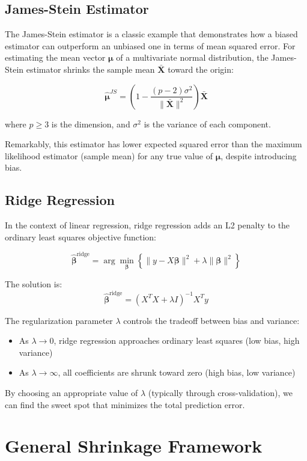 \documentclass{article}
\begin{document}
\subsection{James-Stein Estimator}

The James-Stein estimator is a classic example that demonstrates how a biased estimator can outperform an unbiased one in terms of mean squared error. For estimating the mean vector $\boldsymbol{\mu}$ of a multivariate normal distribution, the James-Stein estimator shrinks the sample mean $\bar{\mathbf{X}}$ toward the origin:

\[
\hat{\boldsymbol{\mu}}^{JS} = \left(1 - \frac{(p-2)\sigma^2}{\|\bar{\mathbf{X}}\|^2}\right) \bar{\mathbf{X}}
\]

where $p \geq 3$ is the dimension, and $\sigma^2$ is the variance of each component.

Remarkably, this estimator has lower expected squared error than the maximum likelihood estimator (sample mean) for any true value of $\boldsymbol{\mu}$, despite introducing bias.

\subsection{Ridge Regression}

In the context of linear regression, ridge regression adds an L2 penalty to the ordinary least squares objective function:

\[
\hat{\boldsymbol{\beta}}^{\text{ridge}} = \arg\min_{\boldsymbol{\beta}} \left\{ \|y - X\boldsymbol{\beta}\|^2 + \lambda \|\boldsymbol{\beta}\|^2 \right\}
\]

The solution is:
\[
\hat{\boldsymbol{\beta}}^{\text{ridge}} = (X^TX + \lambda I)^{-1}X^Ty
\]

The regularization parameter $\lambda$ controls the tradeoff between bias and variance:
\begin{itemize}
\item As $\lambda \to 0$, ridge regression approaches ordinary least squares (low bias, high variance)
\item As $\lambda \to \infty$, all coefficients are shrunk toward zero (high bias, low variance)
\end{itemize}

By choosing an appropriate value of $\lambda$ (typically through cross-validation), we can find the sweet spot that minimizes the total prediction error.

\section{General Shrinkage Framework}
\end{document}
